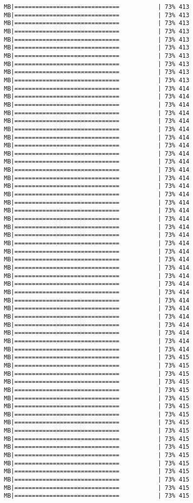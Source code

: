 \documentclass[
]{article}
\begin{document}
\begin{verbatim}
MB|==============================           | 73% 413 MB|==============================           | 73% 413 MB|==============================           | 73% 413 MB|==============================           | 73% 413 MB|==============================           | 73% 413 MB|==============================           | 73% 413 MB|==============================           | 73% 413 MB|==============================           | 73% 413 MB|==============================           | 73% 413 MB|==============================           | 73% 413 MB|==============================           | 73% 414 MB|==============================           | 73% 414 MB|==============================           | 73% 414 MB|==============================           | 73% 414 MB|==============================           | 73% 414 MB|==============================           | 73% 414 MB|==============================           | 73% 414 MB|==============================           | 73% 414 MB|==============================           | 73% 414 MB|==============================           | 73% 414 MB|==============================           | 73% 414 MB|==============================           | 73% 414 MB|==============================           | 73% 414 MB|==============================           | 73% 414 MB|==============================           | 73% 414 MB|==============================           | 73% 414 MB|==============================           | 73% 414 MB|==============================           | 73% 414 MB|==============================           | 73% 414 MB|==============================           | 73% 414 MB|==============================           | 73% 414 MB|==============================           | 73% 414 MB|==============================           | 73% 414 MB|==============================           | 73% 414 MB|==============================           | 73% 414 MB|==============================           | 73% 414 MB|==============================           | 73% 414 MB|==============================           | 73% 414 MB|==============================           | 73% 414 MB|==============================           | 73% 414 MB|==============================           | 73% 414 MB|==============================           | 73% 414 MB|==============================           | 73% 414 MB|==============================           | 73% 415 MB|==============================           | 73% 415 MB|==============================           | 73% 415 MB|==============================           | 73% 415 MB|==============================           | 73% 415 MB|==============================           | 73% 415 MB|==============================           | 73% 415 MB|==============================           | 73% 415 MB|==============================           | 73% 415 MB|==============================           | 73% 415 MB|==============================           | 73% 415 MB|==============================           | 73% 415 MB|==============================           | 73% 415 MB|==============================           | 73% 415 MB|==============================           | 73% 415 MB|==============================           | 73% 415 MB|==============================           | 73% 415 MB|==============================           | 73% 415 
\end{verbatim}
\end{document}
